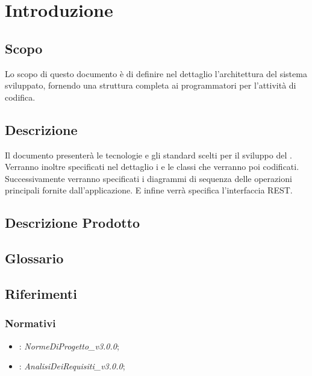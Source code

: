 \documentclass[12pt,a4paper]{article}
\begin{document}
\newpage
\tableofcontents
\newpage
\listoftables
\listoffigures
\newpage

\section{Introduzione}	\label{intro}
\subsection{Scopo}
Lo scopo di questo documento è di definire nel dettaglio l'architettura del sistema sviluppato, fornendo una struttura completa ai programmatori per l'attività di codifica.

\subsection{Descrizione}
Il documento presenterà le tecnologie e gli standard scelti per il sviluppo del . Verranno inoltre specificati nel dettaglio i  e le classi che verranno poi codificati. Successivamente verranno specificati i diagrammi di sequenza delle operazioni principali fornite dall'applicazione. E infine verrà specifica l'interfaccia REST.

\subsection{Descrizione Prodotto}
\descrizioneProdotto

\subsection{Glossario}
\glossarioPrint

\subsection{Riferimenti}

\subsubsection{Normativi}
\begin{itemize}
    \item \NdP{}: \textit{NormeDiProgetto\_v3.0.0};
    \item \AdR{}: \textit{AnalisiDeiRequisiti\_v3.0.0};
\end{itemize}
\end{document}
